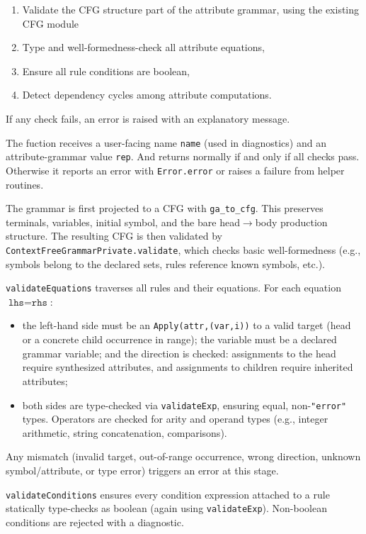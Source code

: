 \begin{enumerate}
  \item Validate the CFG structure part of the attribute grammar, using the existing CFG module
  \item Type and well-formedness-check all attribute equations,
  \item Ensure all rule conditions are boolean,
  \item Detect dependency cycles among attribute computations. 
\end{enumerate}

If any check fails, an error is raised with an explanatory message. 

The fuction receives a user-facing name \texttt{name} (used in diagnostics) and an attribute-grammar value \texttt{rep}. And returns normally if and only 
if all checks pass. Otherwise it reports an error with \texttt{Error.error} or raises a failure from helper routines. 

The grammar is first projected to a CFG with \texttt{ga\_to\_cfg}. This preserves terminals, variables, initial symbol, and the bare head\(\to\)body production 
structure. The resulting CFG is then validated by \texttt{ContextFreeGrammarPrivate.validate}, which checks basic well-formedness (e.g., symbols belong to the 
declared sets, rules reference known symbols, etc.). 

\texttt{validateEquations} traverses all rules and their equations. For each equation \( \texttt{lhs} = \texttt{rhs} \):
\begin{itemize}
  \item the left-hand side must be an \texttt{Apply(attr,(var,i))} to a valid target (head or a concrete child occurrence in range); the variable must be 
  a declared grammar variable; and the direction is checked: assignments to the head require synthesized attributes, and assignments to children require 
  inherited attributes; 
  \item both sides are type-checked via \texttt{validateExp}, ensuring equal, non-\texttt{"error"} types. Operators are checked for arity and operand types 
  (e.g., integer arithmetic, string concatenation, comparisons). 
\end{itemize}
Any mismatch (invalid target, out-of-range occurrence, wrong direction, unknown symbol/attribute, or type error) triggers an error at this stage. 

\texttt{validateConditions} ensures every condition expression attached to a rule statically type-checks as boolean (again using \texttt{validateExp}). 
Non-boolean conditions are rejected with a diagnostic. 

